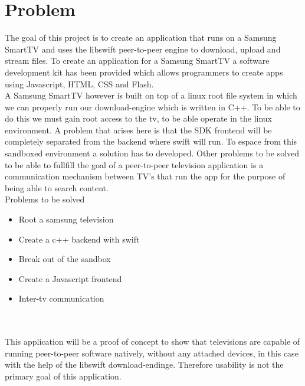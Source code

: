 \chapter{Problem}

The goal of this project is to create an application that runs on a Samsung SmartTV and uses the libswift peer-to-peer engine to download, upload and stream files. To create an application for a Samsung SmartTV a software development kit has been provided which allows programmers to create apps using Javascript, HTML, CSS and Flash.\\
A Samsung SmartTV however is built on top of a linux root file system in which we can properly run our download-engine which is written in C++. To be able to do this we must gain root access to the tv, to be able operate in the linux environment. A problem that arises here is that the SDK frontend will be completely separated from the backend where swift will run. To espace from this sandboxed environment a solution has to developed. Other problems to be solved to be able to fullfill the goal of a peer-to-peer television application is a communication mechanism between TV's that run the app for the purpose of being able to search content.\\

Problems to be solved
\begin{itemize}
\item Root a samsung television
\item Create a c++ backend with swift
\item Break out of the sandbox
\item Create a Javascript frontend
\item Inter-tv communication
\end{itemize}
\\\\
This application will be a proof of concept to show that televisions are capable of running peer-to-peer software natively, without any attached devices, in this case with the help of the libswift download-endinge. Therefore usability is not the primary goal of this application.

